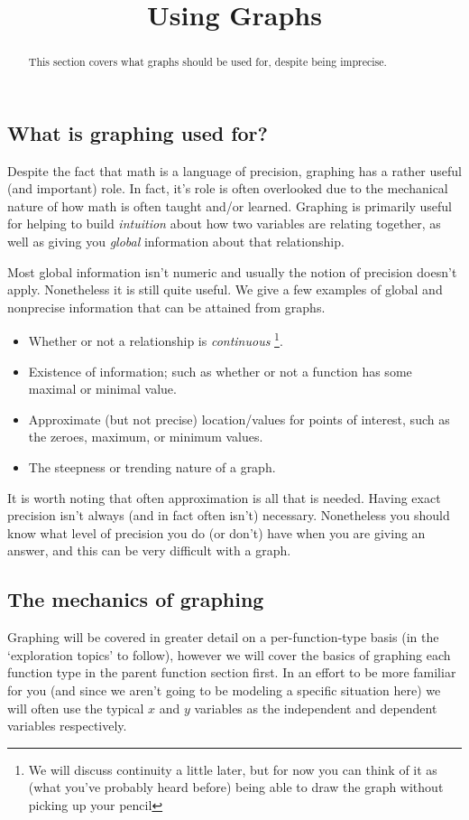 \documentclass{ximera}
\title{Using Graphs}
\begin{document}
\begin{abstract}
    This section covers what graphs should be used for, despite being imprecise.
\end{abstract}
\maketitle

\subsection*{What is graphing used for?}
    
    Despite the fact that math is a language of precision, graphing has a rather useful (and important) role. In fact, it's role is often overlooked due to the mechanical nature of how math is often taught and/or learned. Graphing is primarily useful for helping to build \textit{intuition} about how two variables are relating together, as well as giving you \textit{global} information about that relationship.
    
    Most global information isn't numeric and usually the notion of precision doesn't apply. Nonetheless it is still quite useful. We give a few examples of global and nonprecise information that can be attained from graphs. 
    \begin{itemize}
        \item Whether or not a relationship is \textit{continuous}%
        \footnote{
        We will discuss continuity a little later, but for now you can think of it as (what you've probably heard before) being able to draw the graph without picking up your pencil
        }.
        \item Existence of information; such as whether or not a function has some maximal or minimal value.
        \item Approximate (but not precise) location/values for points of interest, such as the zeroes, maximum, or minimum values.
        \item The steepness or trending nature of a graph.
     \end{itemize}
     It is worth noting that often approximation is all that is needed. Having exact precision isn't always (and in fact often isn't) necessary. Nonetheless you should know what level of precision you do (or don't) have when you are giving an answer, and this can be very difficult with a graph.
    
\subsection*{The mechanics of graphing}
    Graphing will be covered in greater detail on a per-function-type basis (in the `exploration topics' to follow), however we will cover the basics of graphing each function type in the parent function section first. In an effort to be more familiar for you (and since we aren't going to be modeling a specific situation here) we will often use the typical $x$ and $y$ variables as the independent and dependent variables respectively.
\end{document}
